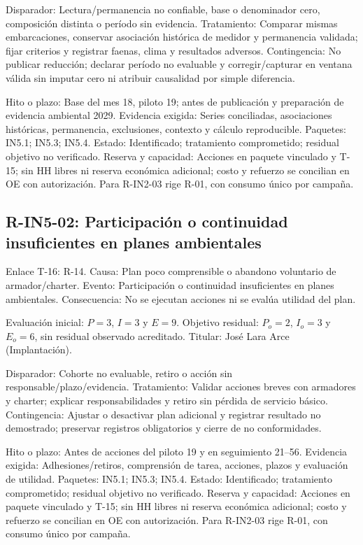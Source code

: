 Disparador: Lectura/permanencia no confiable, base o denominador cero, composición distinta o período sin evidencia. Tratamiento: Comparar mismas embarcaciones, conservar asociación histórica de medidor y permanencia validada; fijar criterios y registrar faenas, clima y resultados adversos. Contingencia: No publicar reducción; declarar período no evaluable y corregir/capturar en ventana válida sin imputar cero ni atribuir causalidad por simple diferencia.

Hito o plazo: Base del mes 18, piloto 19; antes de publicación y preparación de evidencia ambiental 2029. Evidencia exigida: Series conciliadas, asociaciones históricas, permanencia, exclusiones, contexto y cálculo reproducible. Paquetes: IN5.1; IN5.3; IN5.4. Estado: Identificado; tratamiento comprometido; residual objetivo no verificado. Reserva y capacidad: Acciones en paquete vinculado y T-15; sin HH libres ni reserva económica adicional; costo y refuerzo se concilian en OE con autorización. Para R-IN2-03 rige R-01, con consumo único por campaña.

\subsection{R-IN5-02: Participación o continuidad insuficientes en planes ambientales}
Enlace T-16: R-14. Causa: Plan poco comprensible o abandono voluntario de armador/charter. Evento: Participación o continuidad insuficientes en planes ambientales. Consecuencia: No se ejecutan acciones ni se evalúa utilidad del plan.

Evaluación inicial: $P=3$, $I=3$ y $E=9$. Objetivo residual: $P_o=2$, $I_o=3$ y $E_o=6$, sin residual observado acreditado. Titular: José Lara Arce (Implantación).

Disparador: Cohorte no evaluable, retiro o acción sin responsable/plazo/evidencia. Tratamiento: Validar acciones breves con armadores y charter; explicar responsabilidades y retiro sin pérdida de servicio básico. Contingencia: Ajustar o desactivar plan adicional y registrar resultado no demostrado; preservar registros obligatorios y cierre de no conformidades.

Hito o plazo: Antes de acciones del piloto 19 y en seguimiento 21--56. Evidencia exigida: Adhesiones/retiros, comprensión de tarea, acciones, plazos y evaluación de utilidad. Paquetes: IN5.1; IN5.3; IN5.4. Estado: Identificado; tratamiento comprometido; residual objetivo no verificado. Reserva y capacidad: Acciones en paquete vinculado y T-15; sin HH libres ni reserva económica adicional; costo y refuerzo se concilian en OE con autorización. Para R-IN2-03 rige R-01, con consumo único por campaña.

